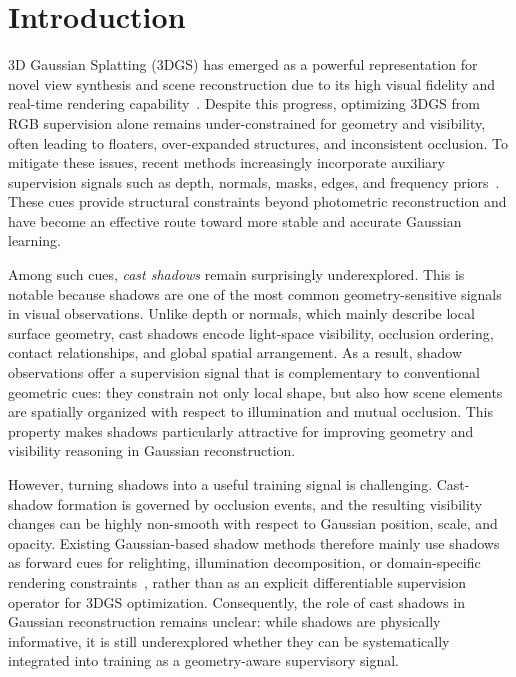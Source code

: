 
\section{Introduction}
\label{sec:intro}

3D Gaussian Splatting (3DGS) has emerged as a powerful representation for novel view synthesis and scene reconstruction due to its high visual fidelity and real-time rendering capability~\cite{3dgs}. Despite this progress, optimizing 3DGS from RGB supervision alone remains under-constrained for geometry and visibility, often leading to floaters, over-expanded structures, and inconsistent occlusion. To mitigate these issues, recent methods increasingly incorporate auxiliary supervision signals such as depth, normals, masks, edges, and frequency priors~\cite{depth_supervision_3dgs, normal_supervision_3dgs, edge_prior_3dgs, frequency_prior_3dgs}. These cues provide structural constraints beyond photometric reconstruction and have become an effective route toward more stable and accurate Gaussian learning.

Among such cues, \emph{cast shadows} remain surprisingly underexplored. This is notable because shadows are one of the most common geometry-sensitive signals in visual observations. Unlike depth or normals, which mainly describe local surface geometry, cast shadows encode light-space visibility, occlusion ordering, contact relationships, and global spatial arrangement. As a result, shadow observations offer a supervision signal that is complementary to conventional geometric cues: they constrain not only local shape, but also how scene elements are spatially organized with respect to illumination and mutual occlusion. This property makes shadows particularly attractive for improving geometry and visibility reasoning in Gaussian reconstruction.

However, turning shadows into a useful training signal is challenging. Cast-shadow formation is governed by occlusion events, and the resulting visibility changes can be highly non-smooth with respect to Gaussian position, scale, and opacity. Existing Gaussian-based shadow methods therefore mainly use shadows as forward cues for relighting, illumination decomposition, or domain-specific rendering constraints~\cite{gaussian_shadow_casting, gs3, rng, shadowgs}, rather than as an explicit differentiable supervision operator for 3DGS optimization. Consequently, the role of cast shadows in Gaussian reconstruction remains unclear: while shadows are physically informative, it is still underexplored whether they can be systematically integrated into training as a geometry-aware supervisory signal.

